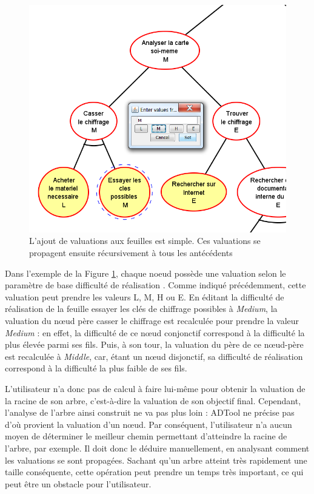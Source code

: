 	\begin{figure}[h]
        \centering
        \includegraphics[width=1\textwidth]{figure/adtool_add_values.png}
        \caption{L'ajout de valuations aux feuilles est simple. Ces valuations se propagent ensuite récursivement à tous les antécédents }
        \label{fig:arbre_exemple_1}
    \end{figure}
	
	Dans l'exemple de la {\sc Figure} \ref{fig:arbre_exemple_1}, chaque noeud possède une valuation selon le paramètre de base \og difficulté de réalisation \fg{}. Comme indiqué précédemment, cette valuation peut prendre les valeurs L, M, H ou E. En éditant la difficulté de réalisation de la feuille \og essayer les clés de chiffrage possibles \fg{}  à \emph{Medium}, la valuation du nœud père \og casser le chiffrage \fg{} est recalculée pour prendre la valeur \emph{Medium} : en effet, la difficulté de ce nœud conjonctif correspond à la difficulté la plus élevée parmi ses fils. Puis, à son tour, la valuation du père de ce nœud-père est recalculée à \emph{Middle}, car, étant un nœud disjonctif, sa difficulté de réalisation correspond à la difficulté la plus faible de ses fils.
	
	L'utilisateur n'a donc pas de calcul à faire lui-même pour obtenir la valuation de la racine de son arbre, c'est-à-dire la valuation de son objectif final. Cependant, l'analyse de l'arbre ainsi construit ne va pas plus loin : ADTool ne précise pas d'où provient la valuation d'un nœud. %
	 Par conséquent, l'utilisateur n'a aucun moyen de déterminer le \og meilleur chemin \fg{} permettant d'atteindre la racine de l'arbre, par exemple. Il doit donc le déduire manuellement, en analysant comment les valuations se sont propagées. Sachant qu'un arbre atteint très rapidement une taille conséquente, cette opération peut prendre un temps très important, ce qui peut être un obstacle pour l'utilisateur.
	
